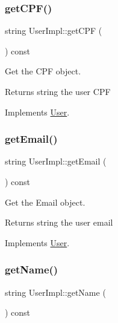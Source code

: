\subsubsection{\texorpdfstring{get\+C\+P\+F()}{getCPF()}}
{\footnotesize\ttfamily string User\+Impl\+::get\+C\+PF (\begin{DoxyParamCaption}{ }\end{DoxyParamCaption}) const\hspace{0.3cm}{\ttfamily [virtual]}}



Get the C\+PF object. 

\begin{DoxyReturn}{Returns}
string the user C\+PF 
\end{DoxyReturn}


Implements \hyperlink{classUser_a2a23ddf63962cdb3d8cef2054a0a27a0}{User}.

\mbox{\label{classUserImpl_add6a78d438f5dc401b220c39c7d40a61}} 
\subsubsection{\texorpdfstring{get\+Email()}{getEmail()}}
{\footnotesize\ttfamily string User\+Impl\+::get\+Email (\begin{DoxyParamCaption}{ }\end{DoxyParamCaption}) const\hspace{0.3cm}{\ttfamily [virtual]}}



Get the Email object. 

\begin{DoxyReturn}{Returns}
string the user email 
\end{DoxyReturn}


Implements \hyperlink{classUser_a58eae5ae9bc079ca5ee31c41326b229e}{User}.

\mbox{\label{classUserImpl_afb305ca89d0de723270de3433e3b5fc1}} 
\subsubsection{\texorpdfstring{get\+Name()}{getName()}}
{\footnotesize\ttfamily string User\+Impl\+::get\+Name (\begin{DoxyParamCaption}{ }\end{DoxyParamCaption}) const\hspace{0.3cm}{\ttfamily [virtual]}}



